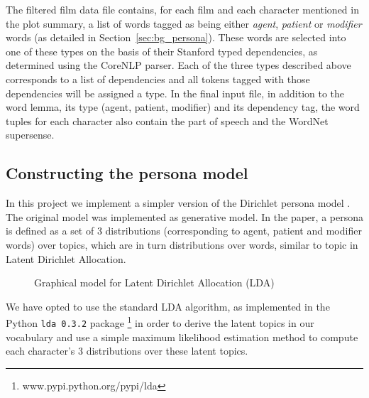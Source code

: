 \documentclass[bsc,frontabs,singlespacing,parskip]{infthesis} %
\begin{document}
The filtered film data file contains, for each film and each character mentioned in the plot summary, a list of words tagged as being either \textit{agent}, \textit{patient} or \textit{modifier} words (as detailed in Section~\ref{sec:bg_persona}). These words are selected into one of these types on the basis of their Stanford typed dependencies, as determined using the CoreNLP parser. Each of the three types described above corresponds to a list of dependencies and all tokens tagged with those dependencies will be assigned a type. In the final input file, in addition to the word lemma, its type (agent, patient, modifier) and its dependency tag, the word tuples for each character also contain the part of speech and the WordNet supersense.


\subsection{Constructing the persona model}
In this project we implement a simpler version of the Dirichlet persona model \cite{Blei2003}. The original model was implemented as generative model. In the paper, a persona is defined as a set of 3 distributions (corresponding to agent, patient and modifier words) over topics, which are in turn distributions over words, similar to topic in Latent Dirichlet Allocation.

\begin{figure}[h!]
\centering
{}
\caption{Graphical model for Latent Dirichlet Allocation (LDA)}
\label{fig:lda}
\end{figure}


We have opted to use the standard LDA algorithm, as implemented in the Python \texttt{lda 0.3.2} package \footnote{ www.pypi.python.org/pypi/lda} in order to derive the latent topics in our vocabulary and use a simple maximum likelihood estimation method to compute each character's 3 distributions over these latent topics.
\end{document}
